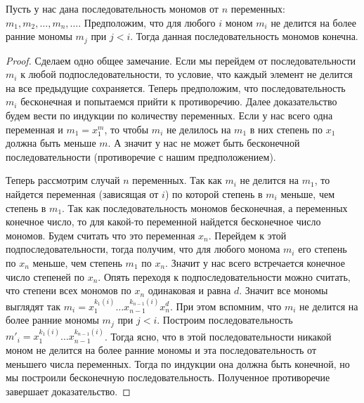 \begin{claim}
\label{claim::DicksonLemma}
Пусть у нас дана последовательность мономов от $n$ переменных: $m_1, m_2, \ldots, m_n,\ldots$.
Предположим, что для любого $i$ моном $m_i$ не делится на более ранние мономы $m_j$ при $j < i$.
Тогда данная последовательность мономов конечна.
\end{claim}
\begin{proof}
Сделаем одно общее замечание.
Если мы перейдем от последовательности $m_i$ к любой подпоследовательности, то условие, что каждый элемент не делится на все предыдущие сохраняется.
Теперь предположим, что последовательность $m_i$ бесконечная и попытаемся прийти к противоречию.
Далее доказательство будем вести по индукции по количеству переменных.
Если у нас всего одна переменная и $m_1 = x_1^m$, то чтобы $m_i$ не делилось на $m_1$ в них степень по $x_1$ должна быть меньше $m$.
А значит у нас не может быть бесконечной последовательности (противоречие с нашим предположением).

Теперь рассмотрим случай $n$ переменных.
Так как $m_i$ не делится на $m_1$, то найдется переменная (зависящая от $i$) по которой степень в $m_i$ меньше, чем степень в $m_1$.
Так как последовательность мономов бесконечная, а переменных конечное число, то для какой-то переменной найдется бесконечное число мономов.
Будем считать что это переменная $x_n$.
Перейдем к этой подпоследовательности, тогда получим, что для любого монома $m_i$ его степень по $x_n$ меньше, чем степень $m_1$ по $x_n$.
Значит у нас всего встречается конечное число степеней по $x_n$.
Опять переходя к подпоследовательности можно считать, что степени всех мономов по $x_n$ одинаковая и равна $d$.
Значит все мономы выглядят так $m_i = x_1^{k_1(i)}\ldots x_{n-1}^{k_{n-1}(i)} x_n ^d$.
При этом вспомним, что $m_i$ не делится на более ранние мономы $m_j$ при $j < i$.
Построим последовательность $m'_i = x_1^{k_1(i)}\ldots x_{n-1}^{k_{n-1}(i)}$.
Тогда ясно, что в этой последовательности никакой моном не делится на более ранние мономы и эта последовательность от меньшего числа переменных.
Тогда по индукции она должна быть конечной, но мы построили бесконечную последовательность.
Полученное противоречие завершает доказательство.
\end{proof}


